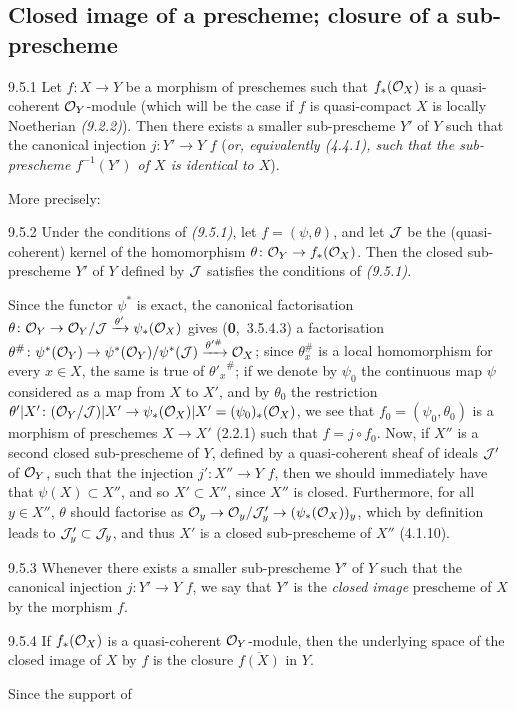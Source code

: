 \documentclass[../main.tex]{subfiles}
\begin{document}
\subsection{Closed image of a prescheme; closure of a sub-prescheme}

\begin{env}[Proposition]{9.5.1}
    Let $f\colon X\to Y$ be a morphism of preschemes such that $f_*(\mathcal{O}_X)$ is a quasi-coherent $\mathcal{O}_Y$-module (which will be the case if $f$ is quasi-compact  $X$ is locally Noetherian \emph{(9.2.2)}).
    Then there exists a smaller sub-prescheme $Y'$ of $Y$ such that the canonical injection $j\colon Y'\to Y$  $f$ (\emph{or, equivalently (4.4.1), such that the sub-prescheme $f^{-1}(Y')$ of $X$ is \emph{identical} to $X$}).
\end{env}

More precisely:

\begin{env}[Corollary]{9.5.2}
    Under the conditions of \emph{(9.5.1)}, let $f=(\psi,\theta)$, and let $\mathcal{J}$ be the (quasi-coherent) kernel of the homomorphism $\theta\colon\mathcal{O}_Y\to f_*(\mathcal{O}_X)$.
    Then the closed sub-prescheme $Y'$ of $Y$ defined by $\mathcal{J}$ satisfies the conditions of \emph{(9.5.1)}.
\end{env}

Since the functor $\psi^*$ is exact, the canonical factorisation $\theta\colon\mathcal{O}_Y\to\mathcal{O}_Y/\mathcal{J}\xrightarrow{\theta'}\psi_*(\mathcal{O}_X)$ gives (\textbf{0},~3.5.4.3) a factorisation $\theta^\#\colon\psi^*(\mathcal{O}_Y)\to\psi^*(\mathcal{O}_Y)/\psi^*(\mathcal{J})\xrightarrow{\theta'^\#}\mathcal{O}_X$; since $\theta_x^\#$ is a local homomorphism for every $x\in X$, the same is true of ${\theta'_x}^\#$; if we denote by $\psi_0$ the continuous map $\psi$ considered as a map from $X$ to $X'$, and by $\theta_0$ the restriction $\theta'|X'\colon(\mathcal{O}_Y/\mathcal{J})|X'\to\psi_*(\mathcal{O}_X)|X'=(\psi_0)_*(\mathcal{O}_X)$, we see that $f_0=(\psi_0,\theta_0)$ is a morphism of preschemes $X\to X'$ (2.2.1) such that $f=j\circ f_0$.
Now, if $X''$ is a second closed sub-prescheme of $Y$, defined by a quasi-coherent sheaf of ideals $\mathcal{J}'$ of $\mathcal{O}_Y$, such that the injection $j'\colon X''\to Y$  $f$, then we should immediately have that $\psi(X)\subset X''$, and so $X'\subset X''$, since $X''$ is closed.
Furthermore, for all $y\in X''$, $\theta$ should factorise as $\mathcal{O}_y\to\mathcal{O}_y/\mathcal{J}'_y\to(\psi_*(\mathcal{O}_X))_y$, which by definition leads to $\mathcal{J}'_y\subset\mathcal{J}_y$, and thus $X'$ is a closed sub-prescheme of $X''$ (4.1.10).

\begin{env}[Definition]{9.5.3}
    Whenever there exists a smaller sub-prescheme $Y'$ of $Y$ such that the canonical injection $j\colon Y'\to Y$  $f$, we say that $Y'$ is the \emph{closed image} prescheme of $X$ by the morphism $f$.
\end{env}

\begin{env}[Proposition]{9.5.4}
    If $f_*(\mathcal{O}_X)$ is a quasi-coherent $\mathcal{O}_Y$-module, then the underlying space of the closed image of $X$ by $f$ is the closure $\overline{f(X)}$ in $Y$.
\end{env}

Since the support of
\end{document}
